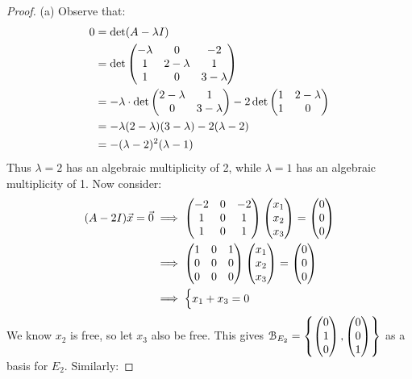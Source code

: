 \documentclass[10pt,twoside,openany]{memoir}
\begin{document}
    {\color{blue} \begin{proof}
        (a) Observe that:
            \begin{equation*}
            \begin{split}
                0
                & = \det(A - \lambda I) \\
                & = \det \left( \begin{matrix} -\lambda & 0 & -2 \\ 1 & 2-\lambda & 1 \\ 1 & 0 & 3 - \lambda \end{matrix} \right) \\
                & = -\lambda \cdot \det \left( \begin{matrix} 2-\lambda & 1 \\ 0 & 3 - \lambda\end{matrix} \right) -2 \det \left( \begin{matrix} 1 & 2-\lambda \\ 1 & 0 \end{matrix} \right) \\
                & = -\lambda(2-\lambda)(3-\lambda) - 2(\lambda - 2) \\
                & = -(\lambda-2)^2(\lambda - 1)
            \end{split}
            \end{equation*}
        Thus $\lambda = 2$ has an algebraic multiplicity of 2, while $\lambda = 1$ has an algebraic multiplicity of 1. Now consider:
            \begin{equation*}
            \begin{split}
                (A-2I)\vec{x} = \vec{0}
                & \implies \left( \begin{matrix} -2 & 0 & -2 \\ 1 & 0 & 1 \\ 1 & 0 & 1 \end{matrix} \right) \left( \begin{matrix} x_1 \\ x_2 \\ x_3 \end{matrix} \right) = \left( \begin{matrix} 0 \\ 0 \\ 0 \end{matrix} \right) \\
                & \implies \left( \begin{matrix} 1 & 0 & 1 \\ 0 & 0 & 0 \\ 0 & 0 & 0 \end{matrix} \right) \left( \begin{matrix} x_1 \\ x_2 \\ x_3 \end{matrix} \right) = \left( \begin{matrix} 0 \\ 0 \\ 0 \end{matrix} \right) \\
                & \implies \begin{cases}
                x_1  + x_3 = 0 \\
                \end{cases}
            \end{split}
            \end{equation*}
        We know $x_2$ is free, so let $x_3$ also be free. This gives $\mathcal{B}_{E_2} = \left\{ \left( \begin{matrix} 0 \\ 1 \\ 0 \end{matrix} \right), \left( \begin{matrix} 0 \\ 0 \\ 1 \end{matrix} \right) \right\}$ as a basis for $E_2$. Similarly:

\end{proof}}
\end{document}
